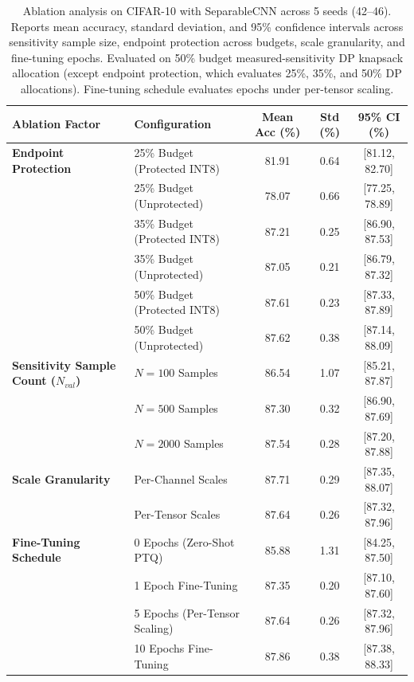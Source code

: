 \begin{table}[!t]
\centering
\caption{Ablation analysis on CIFAR-10 with SeparableCNN across 5 seeds (42--46). Reports mean accuracy, standard deviation, and 95\% confidence intervals across sensitivity sample size, endpoint protection across budgets, scale granularity, and fine-tuning epochs. Evaluated on 50\% budget measured-sensitivity DP knapsack allocation (except endpoint protection, which evaluates 25\%, 35\%, and 50\% DP allocations). Fine-tuning schedule evaluates epochs under per-tensor scaling.}
\label{tab:ablations}
\footnotesize
\begin{tabular}{llccc}
\toprule
\textbf{Ablation Factor} & \textbf{Configuration} & \textbf{Mean Acc (\%)} & \textbf{Std (\%)} & \textbf{95\% CI (\%)} \\
\midrule
\textbf{Endpoint Protection} & 25\% Budget (Protected INT8) & 81.91 & 0.64 & [81.12, 82.70] \\
 & 25\% Budget (Unprotected) & 78.07 & 0.66 & [77.25, 78.89] \\
 & 35\% Budget (Protected INT8) & 87.21 & 0.25 & [86.90, 87.53] \\
 & 35\% Budget (Unprotected) & 87.05 & 0.21 & [86.79, 87.32] \\
 & 50\% Budget (Protected INT8) & 87.61 & 0.23 & [87.33, 87.89] \\
 & 50\% Budget (Unprotected) & 87.62 & 0.38 & [87.14, 88.09] \\
\midrule
\textbf{Sensitivity Sample Count ($N_{val}$)} & $N = 100$ Samples & 86.54 & 1.07 & [85.21, 87.87] \\
 & $N = 500$ Samples & 87.30 & 0.32 & [86.90, 87.69] \\
 & $N = 2000$ Samples & 87.54 & 0.28 & [87.20, 87.88] \\
\midrule
\textbf{Scale Granularity} & Per-Channel Scales & 87.71 & 0.29 & [87.35, 88.07] \\
 & Per-Tensor Scales & 87.64 & 0.26 & [87.32, 87.96] \\
\midrule
\textbf{Fine-Tuning Schedule} & 0 Epochs (Zero-Shot PTQ) & 85.88 & 1.31 & [84.25, 87.50] \\
 & 1 Epoch Fine-Tuning & 87.35 & 0.20 & [87.10, 87.60] \\
 & 5 Epochs (Per-Tensor Scaling) & 87.64 & 0.26 & [87.32, 87.96] \\
 & 10 Epochs Fine-Tuning & 87.86 & 0.38 & [87.38, 88.33] \\
\bottomrule
\end{tabular}
\end{table}
